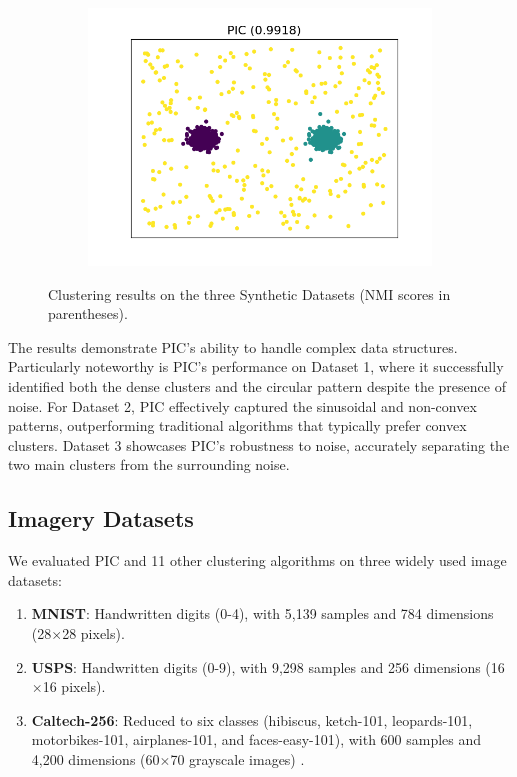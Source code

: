 \begin{figure}[htb]
\begin{subfigure}[b]{0.32\textwidth}
        \includegraphics[width=\textwidth]{../results/plots/dataset_2/PIC_clustering.png}
    \end{subfigure}

    \caption{Clustering results on the three Synthetic Datasets (NMI scores in parentheses).}
    \label{fig:synthetic}
\end{figure}

The results demonstrate PIC's ability to handle complex data structures. Particularly noteworthy is PIC's performance on Dataset 1, where it successfully identified both the dense clusters and the circular pattern despite the presence of noise. For Dataset 2, PIC effectively captured the sinusoidal and non-convex patterns, outperforming traditional algorithms that typically prefer convex clusters. Dataset 3 showcases PIC's robustness to noise, accurately separating the two main clusters from the surrounding noise.

\subsection{Imagery Datasets}
We evaluated PIC and 11 other clustering algorithms \cite{ap,ckernel,ct,kmedoids,ncuts,njw,zell} on three widely used image datasets:

\begin{enumerate}
    \item \textbf{MNIST}: Handwritten digits (0-4), with 5,139 samples and 784 dimensions (28$\times$28 pixels).
    \item \textbf{USPS}: Handwritten digits (0-9), with 9,298 samples and 256 dimensions (16$\times$16 pixels).
    \item \textbf{Caltech-256}: Reduced to six classes (hibiscus, ketch-101, leopards-101, motorbikes-101, airplanes-101, and faces-easy-101), with 600 samples and 4,200 dimensions (60$\times$70 grayscale images) \cite{caltech256}.
\end{enumerate}

